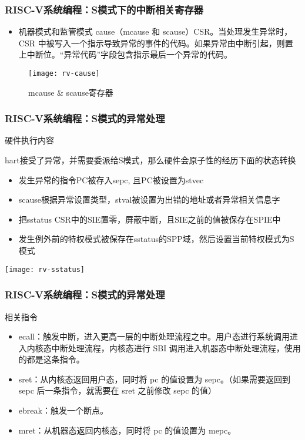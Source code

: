 
\begin{frame}
    \frametitle{RISC-V系统编程：S模式下的中断相关寄存器}
    \begin{itemize}
        \item 机器模式和监管模式 cause（mcause 和 scause）CSR。当处理发生异常时，CSR 中被写入一个指示导致异常的事件的代码。如果异常由中断引起，则置上中断位。“异常代码”字段包含指示最后一个异常的代码。
    \end{itemize}   
    \begin{figure}
        \centering
        \texttt{[image: rv-cause]}
        \caption{mcause  \& scause寄存器}
    \end{figure}
\end{frame}

\begin{frame}
    \frametitle{RISC-V系统编程：S模式的异常处理}
     硬件执行内容
     
     hart接受了异常，并需要委派给S模式，那么硬件会原子性的经历下面的状态转换
    \begin{itemize}
        \item 发生异常的指令PC被存入sepc, 且PC被设置为stvec
        \item scause根据异常设置类型，stval被设置为出错的地址或者异常相关信息字
        \item 把sstatus CSR中的SIE置零，屏蔽中断，且SIE之前的值被保存在SPIE中
        \item 发生例外前的特权模式被保存在sstatus的SPP域，然后设置当前特权模式为S模式
        
    \end{itemize}
        \centering
    \texttt{[image: rv-sstatus]}
\end{frame}


\begin{frame}
    \frametitle{RISC-V系统编程：S模式的异常处理}
    
    相关指令
    \begin{itemize}
        \item ecall：触发中断，进入更高一层的中断处理流程之中。用户态进行系统调用进入内核态中断处理流程，内核态进行 SBI 调用进入机器态中断处理流程，使用的都是这条指令。
        \item sret：从内核态返回用户态，同时将 pc 的值设置为 sepc。（如果需要返回到 sepc 后一条指令，就需要在 sret 之前修改 sepc 的值）
        \item ebreak：触发一个断点。
        \item mret：从机器态返回内核态，同时将 pc 的值设置为 mepc。
        
    \end{itemize}
\end{frame}

